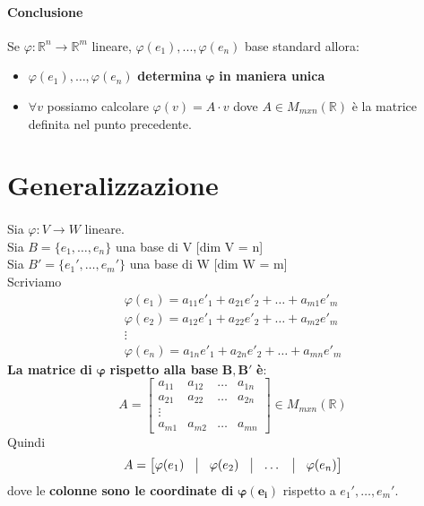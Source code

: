 \documentclass[a4paper, 12pt]{report}
\begin{document}
            \paragraph{Conclusione} Se $\varphi:\mathbb{R}^n\rightarrow \mathbb{R}^m$ lineare, $\varphi(e_1),...,\varphi(e_n)$ base standard allora:
            \begin{itemize}
                \item $\varphi(e_1),\dots,\varphi(e_n)$ \textbf{determina} $\boldsymbol{\varphi}$\textbf{ in maniera unica}
                \item $\forall v$ possiamo calcolare $\varphi(v)=A \cdot v$ dove $A \in M_{mxn} (\mathbb{R})$ è la matrice definita nel punto precedente.
            \end{itemize}
        \section{Generalizzazione}
            \paragraph{}Sia $\varphi:V \rightarrow W$ lineare.\\
            Sia $B=\{e_1,\dots,e_n\}$ una base di V [dim V = n]\\
            Sia $B'=\{e_1',\dots,e_m'\}$ una base di W [dim W = m]\\
            Scriviamo
            $$
            \begin{matrix}
                \varphi(e_1)=a_{11}e'_1+a_{21}e'_2+\dots+a_{m1}e'_m\\
                \varphi(e_2)=a_{12}e'_1+a_{22}e'_2+\dots+a_{m2}e'_m\\
                \vdots\\
                \varphi(e_n)=a_{1n}e'_1+a_{2n}e'_2+\dots+a_{mn}e'_m
            \end{matrix}
            $$
            \textbf{La matrice di} $\boldsymbol{\varphi}$ \textbf{rispetto alla base} $\boldsymbol{B,B'}$ \textbf{è}:
            $$
            A=
            \begin{bmatrix}
                a_{11} & a_{12} & \dots & a_{1n}\\
                a_{21} & a_{22} & \dots & a_{2n}\\
                \vdots\\
                a_{m1} & a_{m2} & \dots & a_{mn}
            \end{bmatrix}
            \in M_{mxn}(\mathbb{R})
            $$
            Quindi 
            $$
            A=
            \begin{bmatrix}
                \varphi(e_1)& \vline & \varphi(e_2)& \vline & \dots & \vline & \varphi(e_n)
            \end{bmatrix}
            $$
            dove le \textbf{colonne sono le coordinate di} $\boldsymbol{\varphi(e_i)}$ rispetto a $e_1',\dots,e_m'$.
\end{document}
